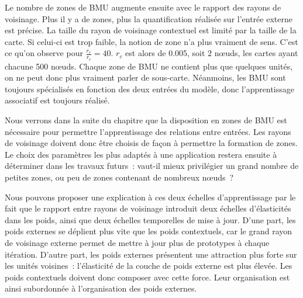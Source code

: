 \documentclass[../main]{subfiles}
\begin{document}
Le nombre de zones de BMU augmente ensuite avec le rapport des rayons de voisinage. Plus il y a de zones, plus la quantification réalisée sur l'entrée externe est précise.
La taille du rayon de voisinage contextuel est  limité par la taille de la carte. Si celui-ci est trop faible, la notion de zone n'a plus vraiment de sens. C'est ce qu'on observe pour $\frac{r_e}{r_c} = 40$. $r_c$ est alors de 0.005, soit $2$ n\oe{}uds, les cartes ayant chacune 500 n\oe{}uds. 
Chaque zone de BMU ne contient plus que quelques unités, on ne peut donc plus vraiment parler de sous-carte. Néanmoins, les BMU sont toujours spécialisés en fonction des deux entrées du modèle, donc l'apprentissage associatif est toujours réalisé.

Nous verrons dans la suite du chapitre que la disposition en zones de BMU est nécessaire pour permettre l'apprentissage des relations entre entrées. Les rayons de voisinage doivent donc être choisis de façon à permettre la formation de zones. Le choix des paramètres les plus adaptés à une application restera ensuite à déterminer dans les travaux futurs~: vaut-il mieux privilégier un grand nombre de petites zones, ou peu de zones contenant de nombreux n\oe{}uds~?

Nous pouvons proposer une explication à ces deux échelles d'apprentissage par le fait que le rapport entre rayons de voisinage introduit deux échelles d'élasticités dans les poids, ainsi que deux échelles temporelles de mise à jour.
D'une part, les poids externes se déplient plus vite que les poids contextuels, car le grand rayon de voisinage externe permet de mettre à jour plus de prototypes à chaque itération.
D'autre part, les poids externes présentent une \og attraction \fg{} plus forte sur les unités voisines~: l'élasticité de la couche de poids externe est plus élevée.
Les poids contextuels doivent donc composer avec cette force. Leur organisation est ainsi subordonnée à l'organisation des poids externes. 
\end{document}
